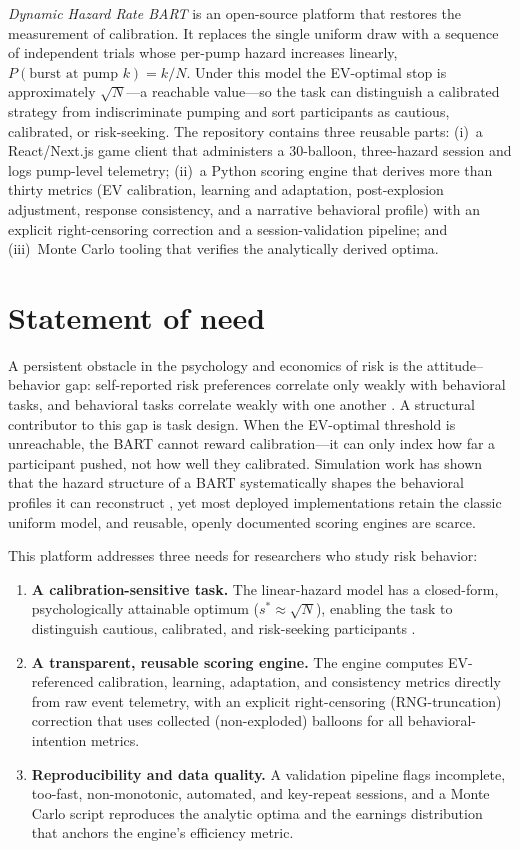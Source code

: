 \documentclass[11pt]{article}
\begin{document}
\emph{Dynamic Hazard Rate BART} is an open-source platform that restores the
measurement of calibration. It replaces the single uniform draw with a sequence
of independent trials whose per-pump hazard increases linearly,
$P(\text{burst at pump }k)=k/N$. Under this model the EV-optimal stop is
approximately $\sqrt{N}$---a reachable value---so the task can distinguish a
calibrated strategy from indiscriminate pumping and sort participants as cautious,
calibrated, or risk-seeking. The repository contains
three reusable parts: (i)~a React/Next.js game client that administers a
30-balloon, three-hazard session and logs pump-level telemetry; (ii)~a Python
scoring engine that derives more than thirty metrics (EV calibration, learning and
adaptation, post-explosion adjustment, response consistency, and a narrative
behavioral profile) with an explicit right-censoring correction and a
session-validation pipeline; and (iii)~Monte Carlo tooling that verifies the
analytically derived optima.

\section{Statement of need}

A persistent obstacle in the psychology and economics of risk is the
attitude--behavior gap: self-reported risk preferences correlate only weakly with
behavioral tasks, and behavioral tasks correlate weakly with one another
\citep{frey2017,pedroni2017}. A structural contributor to this gap is task design.
When the EV-optimal threshold is unreachable, the BART cannot reward
calibration---it can only index how far a participant pushed, not how well they
calibrated. Simulation work has
shown that the hazard structure of a BART systematically shapes the behavioral
profiles it can reconstruct \citep{diplinio2022}, yet most deployed
implementations retain the classic uniform model, and reusable, openly documented
scoring engines are scarce.

This platform addresses three needs for researchers who study risk behavior:

\begin{enumerate}[leftmargin=1.4em]
  \item \textbf{A calibration-sensitive task.} The linear-hazard model has a
  closed-form, psychologically attainable optimum ($s^*\approx\sqrt{N}$), enabling
  the task to distinguish cautious, calibrated, and risk-seeking
  participants \citep{pleskac2008,wallsten2005}.
  \item \textbf{A transparent, reusable scoring engine.} The engine computes
  EV-referenced calibration, learning, adaptation, and consistency metrics
  directly from raw event telemetry, with an explicit right-censoring
  (RNG-truncation) correction that uses collected (non-exploded) balloons for all
  behavioral-intention metrics.
  \item \textbf{Reproducibility and data quality.} A validation pipeline flags
  incomplete, too-fast, non-monotonic, automated, and key-repeat sessions, and a
  Monte Carlo script reproduces the analytic optima and the earnings distribution
  that anchors the engine's efficiency metric.
\end{enumerate}
\end{document}
